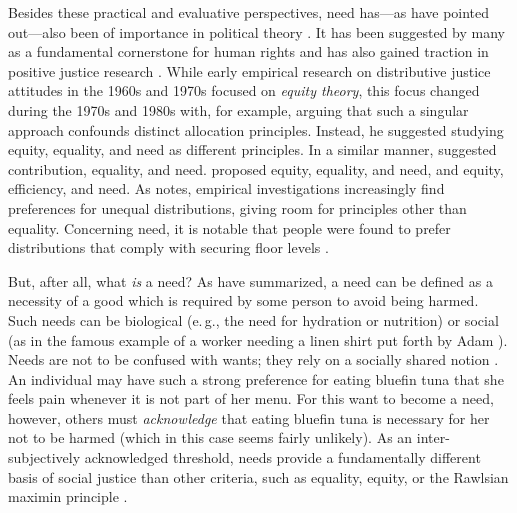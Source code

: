 \documentclass[12pt]{scrartcl}
\begin{document}
Besides these practical and evaluative perspectives, need has---as \cite{bauer_need_2022} have pointed out---also been of importance in political theory \citep{dean_translation_2013,doyal_theory_1984,nussbaum_human_1992,weale_political_1984}.
It has been suggested by many as a fundamental cornerstone for human rights \citep[e.\,g.,][]{brock_needs_2005,gasper_needs_2005,renzo_human_2015} and has also gained traction in positive justice research \citep[for summary of some recent work, see, e.\,g.,][]{miller_needs-based_2020}.
While early empirical research on distributive justice attitudes in the 1960s and 1970s focused on \textit{equity theory}, this focus changed during the 1970s and 1980s with, for example, \cite{deutsch_equity_1975} arguing that such a singular approach confounds distinct allocation principles.
Instead, he suggested studying equity, equality, and need as different principles.
In a similar manner, \cite{schwinger_just_1980} suggested contribution, equality, and need.
\cite{wagstaff_equity_1994} proposed equity, equality, and need, and \cite{konow_fair_2001} equity, efficiency, and need.
As \cite{konow_is_2009} notes, empirical investigations increasingly find preferences for unequal distributions, giving room for principles other than equality.
Concerning need, it is notable that people were found to prefer distributions that comply with securing floor levels \citep[e.\,g.][]{ahlert_thresholds_2012,frohlich_choosing_1992,frohlich_choices_1987}.

But, after all, what \textit{is} a need?
As \cite{bauer_need_2022} have summarized, a need can be defined as a necessity of a good which is required by some person to avoid being harmed.
Such needs can be biological (e.\,g., the need for hydration or nutrition) or social (as in the famous example of a worker needing a linen shirt put forth by Adam \citealt{smith_wealth_1979}).
Needs are not to be confused with wants; they rely on a socially shared notion \citep{miller_principles_1999}.
An individual may have such a strong preference for eating bluefin tuna that she feels pain whenever it is not part of her menu.
For this want to become a need, however, others must \textit{acknowledge} that eating bluefin tuna is necessary for her not to be harmed (which in this case seems fairly unlikely).
As an inter-subjectively acknowledged threshold, needs provide a fundamentally different basis of social justice than other criteria, such as equality, equity, or the Rawlsian maximin principle \citep[for philosophical overviews on need-based justice, see][]{miller_needs-based_2020,siebel_need_2020}.
\end{document}

